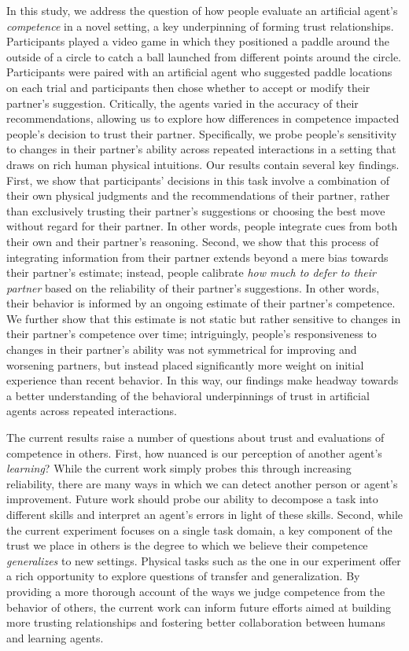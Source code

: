 \documentclass[10pt,letterpaper]{article}
\begin{document}
In this study, we address the question of how people evaluate an artificial agent's \textit{competence} in a novel setting, a key underpinning of forming trust relationships. Participants played a video game in which they positioned a paddle around the outside of a circle to catch a ball launched from different points around the circle. Participants were paired with an artificial agent who suggested paddle locations on each trial and participants then chose whether to accept or modify their partner's suggestion. Critically, the agents varied in the accuracy of their recommendations, allowing us to explore how differences in competence impacted people's decision to trust their partner. Specifically, we probe people's sensitivity to changes in their partner's ability across repeated interactions in a setting that draws on rich human physical intuitions. Our results contain several key findings. First, we show that participants' decisions in this task involve a combination of their own physical judgments and the recommendations of their partner, rather than exclusively trusting their partner's suggestions or choosing the best move without regard for their partner. In other words, people integrate cues from both their own and their partner's reasoning. Second, we show that this process of integrating information from their partner extends beyond a mere bias towards their partner's estimate; instead, people calibrate \textit{how much to defer to their partner} based on the reliability of their partner's suggestions. In other words, their behavior is informed by an ongoing estimate of their partner's competence. We further show that this estimate is not static but rather sensitive to changes in their partner's competence over time; intriguingly, people's responsiveness to changes in their partner's ability was not symmetrical for improving and worsening partners, but instead placed significantly more weight on initial experience than recent behavior. In this way, our findings make headway towards a better understanding of the behavioral underpinnings of trust in artificial agents across repeated interactions. 

The current results raise a number of questions about trust and evaluations of competence in others. First, how nuanced is our perception of another agent's \textit{learning}? While the current work simply probes this through increasing reliability, there are many ways in which we can detect another person or agent's improvement. Future work should probe our ability to decompose a task into different skills and interpret an agent's errors in light of these skills. Second, while the current experiment focuses on a single task domain, a key component of the trust we place in others is the degree to which we believe their competence \textit{generalizes} to new settings. Physical tasks such as the one in our experiment offer a rich opportunity to explore questions of transfer and generalization. By providing a more thorough account of the ways we judge competence from the behavior of others, the current work can inform future efforts aimed at building more trusting relationships and fostering better collaboration between humans and learning agents.
\end{document}
